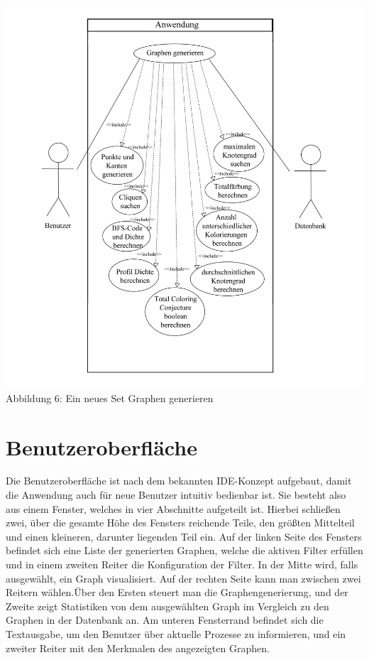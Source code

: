 \documentclass[13pt]{scrreprt}
\begin{document}
\includegraphics[scale=0.75]{Graphen_generieren.jpg}
\centering Abbildung 6: Ein neues Set Graphen generieren 
\\


\chapter{Benutzeroberfläche}

\begin{flushleft}
Die Benutzeroberfläche ist nach dem bekannten IDE-Konzept aufgebaut, damit die Anwendung auch für neue Benutzer intuitiv bedienbar ist. Sie besteht also aus einem Fenster, welches in vier Abschnitte aufgeteilt ist. Hierbei schließen zwei, über die gesamte Höhe des Fensters reichende Teile, den größten Mittelteil und einen kleineren, darunter liegenden Teil ein. Auf der linken Seite des Fensters befindet sich eine Liste der generierten Graphen, welche die aktiven Filter erfüllen und in einem zweiten Reiter die Konfiguration der Filter. In der Mitte wird, falls ausgewählt, ein Graph visualisiert. Auf der rechten Seite kann man zwischen zwei Reitern wählen.Über den Ersten steuert man die Graphengenerierung, und der Zweite zeigt Statistiken von dem ausgewählten Graph im Vergleich zu den Graphen in der Datenbank an. Am unteren Fensterrand befindet sich die Textausgabe, um den Benutzer über aktuelle Prozesse zu informieren, und ein zweiter Reiter mit den Merkmalen des angezeigten Graphen.
\end{flushleft}
\end{document}
